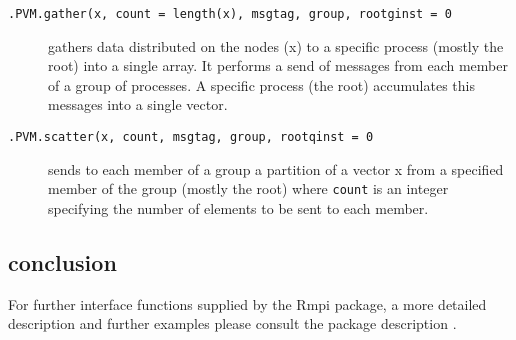 \begin{description}
\item[\texttt{.PVM.gather(x, count = length(x), msgtag, group,
    rootginst = 0}] gathers data distributed on the nodes (x) to a
  specific process (mostly the root) into a single array. It performs
  a send of messages from each member of a group of processes. A
  specific process (the root) accumulates this messages into a single vector.
\item[\texttt{.PVM.scatter(x, count, msgtag, group, rootqinst = 0}]
  sends to each member of a group a partition of  a vector x from a
  specified member of the group (mostly the root) where \texttt{count}
  is an integer specifying the number of elements to be sent to each
  member. 
\end{description}

\subsection{conclusion}


For further interface functions supplied by the Rmpi package, a more detailed
description and further examples please consult the package description
\cite{yu06Rmpi}.
